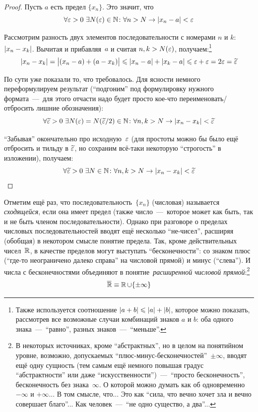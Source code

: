 \documentclass[a4paper,12pt]{article}
\newcommand{\widebar}[1]{\overline{#1\mkern-1.5mu}\mkern 1.5mu}  %
\begin{document}
  
  \begin{proof}
    Пусть $a$ есть предел $\{x_n\}$.
    Это значит, что
    \[
      \forall \eps > 0\ \exists N(\eps) \in \NN\colon \forall n > N \to |x_n - a| < \eps
    \]
    
    Рассмотрим разность двух элементов последовательности с номерами $n$ и $k$: $|x_n \hm- x_k|$.
    Вычитая и прибавляя~$a$ и считая $n, k \hm> N(\eps)$, получаем:\footnote{
      Также используется соотношение $|a \hm+ b| \hm\leq |a| \hm+ |b|$, которое можно показать, рассмотрев все возможные случаи комбинаций знаков $a$ и $b$: оба одного знака~---~``равно'', разных знаков~---~``меньше''.
    }
    \[
      |x_n - x_k| = \bigl|(x_n - a) + (a - x_k)\bigr| \leqslant |x_n - a| + |x_k - a| \leqslant \varepsilon + \varepsilon = 2 \varepsilon = \widetilde {\varepsilon}
    \]
    
    По сути уже показали то, что требовалось.
    Для ясности немного переформулируем результат (``подгоним'' под формулировку нужного формата~---~для этого отчасти надо будет просто кое-что переименовать/отбросить лишние обозначения):
    \[
      \forall \widetilde {\varepsilon} > 0\ \exists N(\varepsilon) = N(\widetilde {\varepsilon} / 2) \in \mathbb N\colon \forall n, k > N \to |x_n - x_k| < \widetilde {\varepsilon}
    \]
    
    ``Забывая'' окончательно про исходную~$\varepsilon$ (для простоты можно бы было ещё отбросить и тильду в $\widetilde {\varepsilon}$, но сохраним всё-таки некоторую ``строгость'' в изложении), получаем:
    \[
      \forall \widetilde {\varepsilon} > 0\ \exists N \in \mathbb N\colon \forall n, k > N \to |x_n - x_k| < \widetilde {\varepsilon}
    \]
  \end{proof}

  Отметим ещё раз, что последовательность~$\{x_n\}$ (числовая) называется \emph{сходящейся}, если она имеет предел (также число~---~которое может как быть, так и не быть членом последовательности).
  Однако при разговоре о пределах числовых последовательностей вводят ещё несколько ``не-чисел'', расширяя (обобщая) в некотором смысле понятие предела.
  Так, кроме действительных чисел~$\operatorname{\mathbb R}$, в качестве пределов могут выступать ``бесконечности'': со знаком плюс (``где-то неограничено далеко справа'' на числовой прямой) и минус (``слева'').
  И числа с бесконечностями объединяют в понятие~\emph{расширенной числовой прямой}:\footnote{
     В некоторых источниках, кроме ``абстрактных'', но в целом на понятийном уровне, возможно, допускаемых ``плюс-минус-бесконечностей''~$\pm \infty$, вводят ещё одну сущность (тем самым ещё немного повышая градус ``абстрактности'' или даже ``искусственности'')~---~``просто бесконечность'', бесконечность без знака~$\infty$.
     О которой можно думать как об одновременно ${-}\infty$ и ${+}\infty$...
     В том смысле, что...
     Это как ``сила, что вечно хочет зла и вечно совершает благо''...
     Как человек~---~``не одно существо, а два''...
  }
  \[
    \widebar{\RR} \equiv \RR \cup \{\pm \infty\}
  \]
\end{document}
